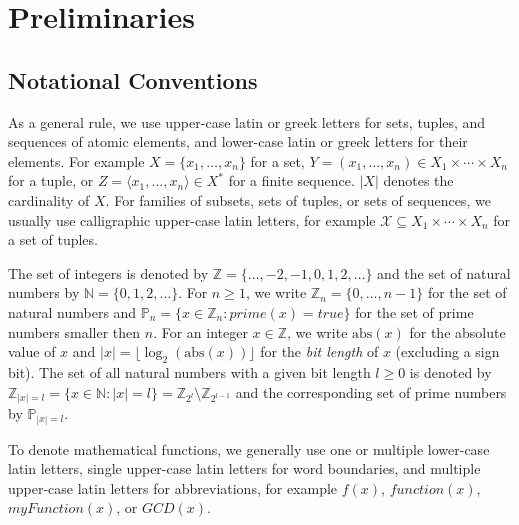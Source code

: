 \documentclass[bibtotoc,halfparskip,oneside]{scrreprt}
\begin{document}
	\chapter{Preliminaries}
	
	\section{Notational Conventions}
	
	As a general rule, we use upper-case latin or greek letters for sets, tuples, and sequences of atomic elements, and lower-case latin or greek letters for their elements. For example $X=\{x_1,\ldots,x_n\}$ for a set, $Y=(x_1,\ldots,x_n)\in X_1\times\cdots\times X_n$ for a tuple, or $Z=\langle x_1,\ldots,x_n\rangle \in X^*$ for a finite sequence. $|X|$ denotes the cardinality of $X$. For families of subsets, sets of tuples, or sets of sequences, we usually use calligraphic upper-case latin letters, for example $\mathcal{X}\subseteq X_1\times\cdots\times X_n$ for a set of tuples.
	
	The set of integers is denoted by $\mathbb{Z}=\{\ldots,-2,-1,0,1,2,\ldots\}$ and the set of natural numbers by $\mathbb{N}=\{0,1,2,\ldots\}$. For $n\geq 1$, we write $\mathbb{Z}_n=\{0,\ldots,n-1\}$ for the set of natural numbers and $\mathbb{P}_n=\{x\in\mathbb{Z}_n:\mathit{prime}(x)=\mathit{true}\}$ for the set of prime numbers smaller then $n$. For an integer $x\in\mathbb{Z}$, we write $\mathrm{abs}(x)$ for the absolute value of $x$ and $|x|=\lfloor\log_2(\mathrm{abs}(x))\rfloor$ for the \emph{bit length} of $x$ (excluding a sign bit). The set of all natural numbers with a given bit length $l\geq 0$ is denoted by $\mathbb{Z}_{|x|=l}=\{x\in\mathbb{N}:|x|=l\}=\mathbb{Z}_{2^l}\setminus\mathbb{Z}_{2^{l-1}}$ and the corresponding set of prime numbers by $\mathbb{P}_{|x|=l}$.
	
	To denote mathematical functions, we generally use one or multiple lower-case latin letters, single upper-case latin letters for word boundaries, and multiple upper-case latin letters for abbreviations, for example $f(x)$, $\mathit{function}(x)$, $\mathit{myFunction}(x)$, or $\mathit{GCD}(x)$.
	
\end{document}

